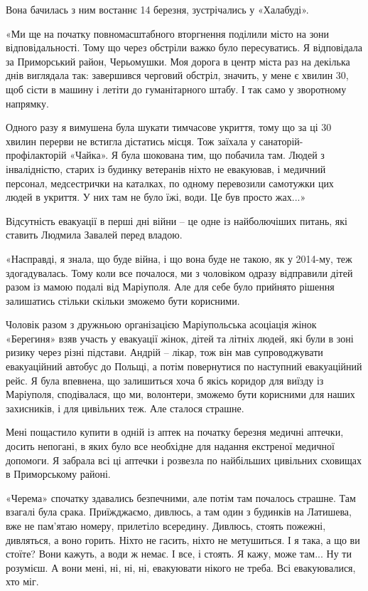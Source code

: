 Вона бачилась з ним востаннє 14 березня, зустрічались у «Халабуді».

«Ми ще на початку повномасштабного вторгнення поділили місто на зони
відповідальності. Тому що через обстріли важко було пересуватись. Я відповідала
за Приморський район, Черьомушки. Моя дорога в центр міста раз на декілька днів
виглядала так: завершився черговий обстріл, значить, у мене є хвилин 30, щоб
сісти в машину і летіти до гуманітарного штабу. І так само у зворотному
напрямку.

Одного разу я вимушена була шукати тимчасове укриття, тому що за ці 30 хвилин
перерви не встигла дістатись місця. Тож заїхала у санаторій-профілакторій
«Чайка». Я була шокована тим, що побачила там. Людей з інвалідністю, старих із
будинку ветеранів ніхто не евакуював, і медичний персонал, медсестрички на
каталках, по одному перевозили самотужки цих людей в укриття. У них там не було
їжі, води. Це був просто жах...»

Відсутність евакуації в перші дні війни – це одне із найболючіших питань, які
ставить Людмила Завалей перед владою.

«Насправді, я знала, що буде війна, і що вона буде не такою, як у 2014-му, теж
здогадувалась. Тому коли все почалося, ми з чоловіком одразу відправили дітей
разом із мамою подалі від Маріуполя. Але для себе було прийнято рішення
залишатись стільки скільки зможемо бути корисними.

Чоловік разом з дружньою організацією Маріупольська асоціація жінок «Берегиня»
взяв участь у евакуації  жінок, дітей та літніх людей, які були в зоні ризику
через різні підстави. Андрій – лікар, тож він мав супроводжувати евакуаційний
автобус до Польщі, а потім повернутися по наступний евакуаційний рейс. Я була
впевнена, що залишиться хоча б якісь коридор для виїзду із Маріуполя,
сподівалася, що ми, волонтери, зможемо бути корисними для наших захисників, і
для цивільних теж. Але сталося страшне.

Мені пощастило купити в одній із аптек на початку березня медичні аптечки,
досить непогані, в яких було все необхідне для надання екстреної медичної
допомоги. Я забрала всі ці аптечки і розвезла по найбільших цивільних сховищах
в Приморському районі. 

«Черема» спочатку здавались безпечними, але потім там почалось страшне. Там
взагалі була срака. Приїжджаємо, дивлюсь, а там один з будинків на Латишева,
вже не пам'ятаю номеру, прилетіло всередину. Дивлюсь, стоять пожежні,
дивляться, а воно горить. Ніхто не гасить, ніхто не метушиться. І я така, а що
ви стоїте? Вони кажуть, а води ж немає. І все, і стоять. Я кажу, може там... Ну
ти розумієш. А вони мені,  ні, ні, ні, евакуювати нікого не треба. Всі
евакуювалися, хто міг.

